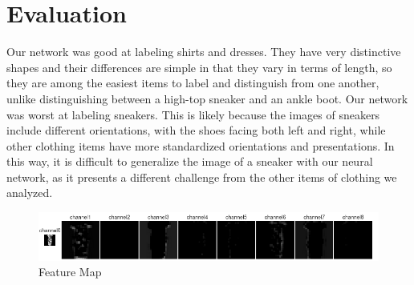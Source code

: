 \documentclass[11pt]{article}
\begin{document}
\section{Evaluation}

Our network was good at labeling shirts and dresses. They have very distinctive
shapes and their differences are simple in that they vary in terms of length,
so they are among the easiest items to label and distinguish from one another,
unlike distinguishing between a high-top sneaker and an ankle boot.
Our network was worst at labeling sneakers. This is likely because the images
of sneakers include different orientations, with the shoes facing both left and
right, while other clothing items have more standardized orientations and presentations.
In this way, it is difficult to generalize the image of a sneaker with our neural
network, as it presents a different challenge from the other items of clothing
we analyzed.

\begin{figure}
    \includegraphics[width=\linewidth]{fm.png}
    \caption{Feature Map}
    \label{fig:Feature Map}
\end{figure}
\end{document}
